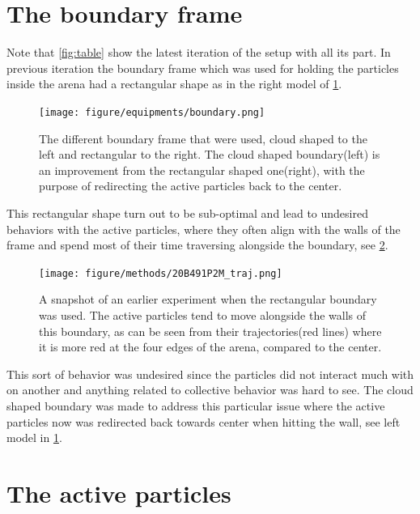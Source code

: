 \section{The boundary frame}

Note that \cref{fig:table} show the latest iteration of the setup with all its part. In previous iteration 
the boundary frame which was used for holding the particles inside the arena had a rectangular shape as 
in the right model of \cref{fig:boundary}.

\begin{figure}[htpb!]
    \centering
    \texttt{[image: figure/equipments/boundary.png]}
    \caption{The different boundary frame that were used, cloud shaped to the left and 
    rectangular to the right. The cloud shaped boundary(left) is an improvement from 
    the rectangular shaped one(right), with the purpose of redirecting the active particles 
    back to the center.}
    \label{fig:boundary}
\end{figure}

This rectangular shape turn out to be sub-optimal and lead to undesired behaviors with the active particles,  
where they often align with the walls of the frame and spend most of their time traversing alongside the boundary, see \cref{fig:walls}.


\begin{figure}[htpb!]
    \centering
    \texttt{[image: figure/methods/20B491P2M\_traj.png]}
    \caption{A snapshot of an earlier experiment when the rectangular boundary was used. 
    The active particles tend to move alongside the walls of this boundary, as can be seen 
    from their trajectories(red lines) where it is more red at the four edges of the arena, 
    compared to the center.}
    \label{fig:walls}
\end{figure}

This sort of behavior was undesired since the particles did not interact much with on another and 
anything related to collective behavior was hard to see. The cloud shaped boundary was made to 
address this particular issue where the active particles now was redirected back towards center 
when hitting the wall, see left model in \cref{fig:boundary}.

\section{The active particles}

